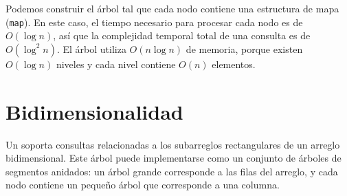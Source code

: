 \begin{center}
\end{center}

Podemos construir el árbol tal que cada nodo contiene una estructura de mapa
(\texttt{map}). En este caso, el tiempo necesario para procesar cada nodo es
de $O(\log n)$, así que la complejidad temporal total de una consulta es de
$O(\log^2 n)$. El árbol utiliza $O(n \log n)$ de memoria, porque existen
$O(\log n)$ niveles y cada nivel contiene $O(n)$ elementos.

\section{Bidimensionalidad}


Un  soporta consultas relacionadas
a los subarreglos rectangulares de un arreglo bidimensional. Este árbol
puede implementarse como un conjunto de árboles de segmentos anidados: un
árbol grande corresponde a las filas del arreglo, y cada nodo contiene un
pequeño árbol que corresponde a una columna.

